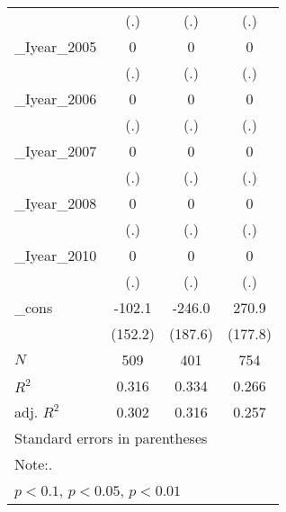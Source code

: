 \begin{table}[htbp]
\begin{tabular}{l*{3}{c}}
          &      (.)         &      (.)         &      (.)         \\
[1em]
\_Iyear\_2005&        0         &        0         &        0         \\
          &      (.)         &      (.)         &      (.)         \\
[1em]
\_Iyear\_2006&        0         &        0         &        0         \\
          &      (.)         &      (.)         &      (.)         \\
[1em]
\_Iyear\_2007&        0         &        0         &        0         \\
          &      (.)         &      (.)         &      (.)         \\
[1em]
\_Iyear\_2008&        0         &        0         &        0         \\
          &      (.)         &      (.)         &      (.)         \\
[1em]
\_Iyear\_2010&        0         &        0         &        0         \\
          &      (.)         &      (.)         &      (.)         \\
[1em]
\_cons    &   -102.1         &   -246.0         &    270.9         \\
          &  (152.2)         &  (187.6)         &  (177.8)         \\
\hline
\(N\)     &      509         &      401         &      754         \\
\(R^{2}\) &    0.316         &    0.334         &    0.266         \\
adj. \(R^{2}\)&    0.302         &    0.316         &    0.257         \\
\hline\hline
\multicolumn{4}{l}{\footnotesize Standard errors in parentheses}\\
\multicolumn{4}{l}{\footnotesize Note:.}\\
\multicolumn{4}{l}{\footnotesize \sym{*} \(p<0.1\), \sym{**} \(p<0.05\), \sym{***} \(p<0.01\)}\\
\end{tabular}
\end{table}
